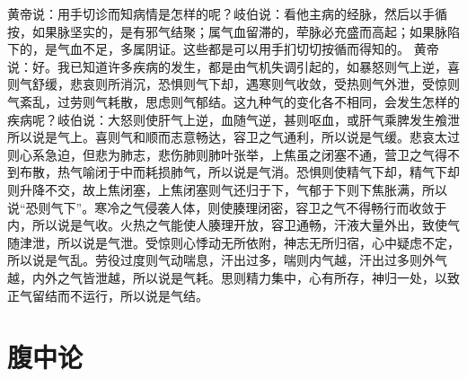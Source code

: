 \documentclass[a4paper,12pt,UTF8,twoside]{ctexbook}
\begin{document}
黄帝说：用手切诊而知病情是怎样的呢？岐伯说：看他主病的经脉，然后以手循按，如果脉坚实的，是有邪气结聚；属气血留滞的，荦脉必充盛而高起；如果脉陷下的，是气血不足，多属阴证。这些都是可以用手扪切切按循而得知的。
黄帝说：好。我已知道许多疾病的发生，都是由气机失调引起的，如暴怒则气上逆，喜则气舒缓，悲哀则所消沉，恐惧则气下却，遇寒则气收敛，受热则气外泄，受惊则气紊乱，过劳则气耗散，思虑则气郁结。这九种气的变化各不相同，会发生怎样的疾病呢？岐伯说：大怒则使肝气上逆，血随气逆，甚则呕血，或肝气乘脾发生飧泄所以说是气上。喜则气和顺而志意畅达，容卫之气通利，所以说是气缓。悲哀太过则心系急迫，但悲为肺志，悲伤肺则肺叶张举，上焦虽之闭塞不通，营卫之气得不到布散，热气喻闭于中而耗损肺气，所以说是气消。恐惧则使精气下却，精气下却则升降不交，故上焦闭塞，上焦闭塞则气还归于下，气郁于下则下焦胀满，所以说“恐则气下”。寒冷之气侵袭人体，则使腠理闭密，容卫之气不得畅行而收敛于内，所以说是气收。火热之气能使人腠理开放，容卫通畅，汗液大量外出，致使气随津泄，所以说是气泄。受惊则心悸动无所依附，神志无所归宿，心中疑虑不定，所以说是气乱。劳役过度则气动喘息，汗出过多，喘则内气越，汗出过多则外气越，内外之气皆泄越，所以说是气耗。思则精力集中，心有所存，神归一处，以致正气留结而不运行，所以说是气结。

\chapter{腹中论}
\end{document}
